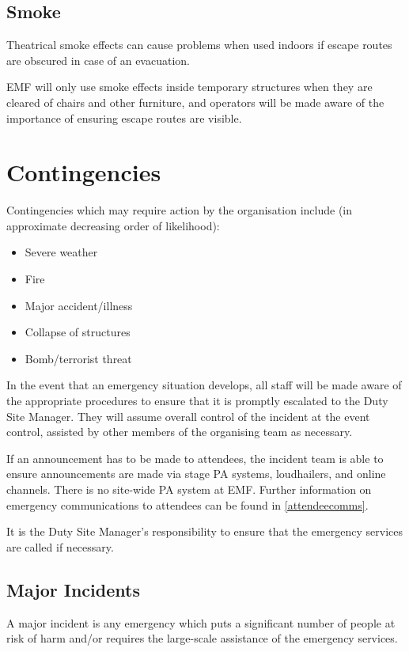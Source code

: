 \subsection{Smoke}
Theatrical smoke effects can cause problems when used indoors if escape
routes are obscured in case of an evacuation.

EMF will only use smoke effects inside temporary structures when they are
cleared of chairs and other furniture, and operators will be made aware of
the importance of ensuring escape routes are visible.

\newpage

\section{Contingencies}\label{contingencies}
Contingencies which may require action by the organisation include (in
approximate decreasing order of likelihood):

\begin{itemize}
\tightlist
  \item Severe weather
  \item Fire
  \item Major accident/illness
  \item Collapse of structures
  \item Bomb/terrorist threat
\end{itemize}

In the event that an emergency situation develops, all staff will be made aware of
the appropriate procedures to ensure that it is promptly escalated to the Duty Site Manager.
They will assume overall control of the incident at the event control, assisted by other
members of the organising team as necessary.

If an announcement has to be made to attendees, the incident team is able to
ensure announcements are made via stage PA systems, loudhailers, and online channels.
There is no site-wide PA system at EMF\@. Further information on emergency communications
to attendees can be found in \cref{attendeecomms}.

It is the Duty Site Manager's responsibility to ensure that the emergency services
are called if necessary.

\subsection{Major Incidents}
A major incident is any emergency which puts a significant number of people at risk
of harm and/or requires the large-scale assistance of the emergency services.

